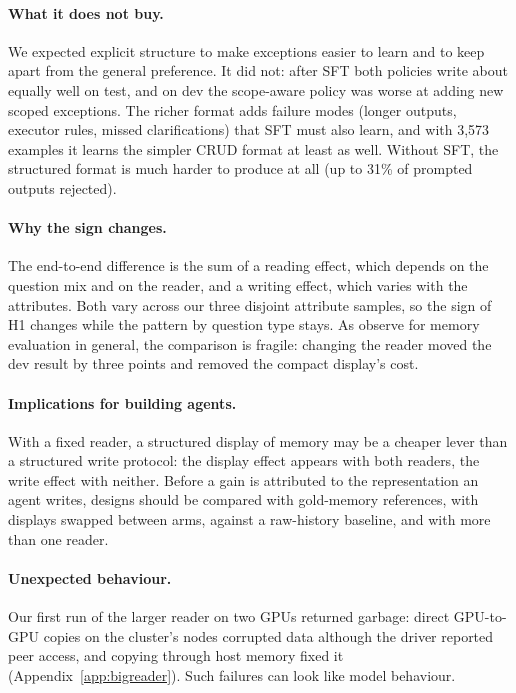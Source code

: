 \documentclass[11pt]{article}
\begin{document}
\paragraph{What it does not buy.} We expected explicit structure to make exceptions easier to learn and to keep apart from the general preference. It did not: after SFT both policies write about equally well on test, and on dev the scope-aware policy was worse at adding new scoped exceptions. The richer format adds failure modes (longer outputs, executor rules, missed clarifications) that SFT must also learn, and with 3,573 examples it learns the simpler CRUD format at least as well. Without SFT, the structured format is much harder to produce at all (up to 31\% of prompted outputs rejected).

\paragraph{Why the sign changes.} The end-to-end difference is the sum of a reading effect, which depends on the question mix and on the reader, and a writing effect, which varies with the attributes. Both vary across our three disjoint attribute samples, so the sign of H1 changes while the pattern by question type stays. As \citet{wang2026memdelta} observe for memory evaluation in general, the comparison is fragile: changing the reader moved the dev result by three points and removed the compact display's cost.

\paragraph{Implications for building agents.} With a fixed reader, a structured display of memory may be a cheaper lever than a structured write protocol: the display effect appears with both readers, the write effect with neither. Before a gain is attributed to the representation an agent writes, designs should be compared with gold-memory references, with displays swapped between arms, against a raw-history baseline, and with more than one reader.

\paragraph{Unexpected behaviour.} Our first run of the larger reader on two GPUs returned garbage: direct GPU-to-GPU copies on the cluster's nodes corrupted data although the driver reported peer access, and copying through host memory fixed it (Appendix~\ref{app:bigreader}). Such failures can look like model behaviour.
\end{document}
